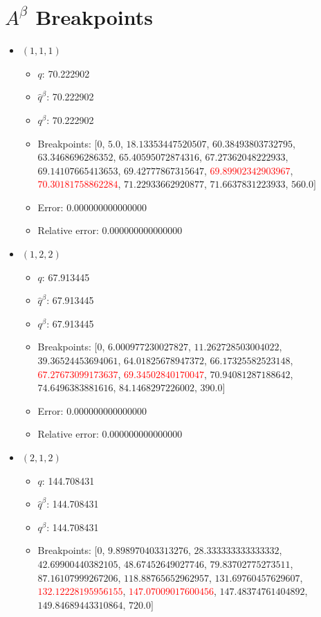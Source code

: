 \documentclass{article}%
\begin{document}
\section{$A^\beta$ Breakpoints}%
\thispagestyle{plain}%
\begin{itemize}%
	\item $(1, 1, 1)$%
	\begin{itemize}%
		\item $q$: 70.222902%
		\item $\hat{q}^\beta$: 70.222902%
		\item $q^\beta$: 70.222902%
		\item Breakpoints: $[$$0$, $5.0$, $18.13353447520507$, $60.38493803732795$, $63.3468696286352$, $65.40595072874316$, $67.27362048222933$, $69.14107665413653$, $69.42777867315647$, \textcolor{red}{$69.89902342903967$}, \textcolor{red}{$70.30181758862284$}, $71.22933662920877$, $71.6637831223933$, $560.0$$]$%
		\item Error: 0.000000000000000%
		\item Relative error: 0.000000000000000%
	\end{itemize}%
	\item $(1, 2, 2)$%
	\begin{itemize}%
		\item $q$: 67.913445%
		\item $\hat{q}^\beta$: 67.913445%
		\item $q^\beta$: 67.913445%
		\item Breakpoints: $[$$0$, $6.000977230027827$, $11.262728503004022$, $39.36524453694061$, $64.01825678947372$, $66.17325582523148$, \textcolor{red}{$67.27673099173637$}, \textcolor{red}{$69.34502840170047$}, $70.94081287188642$, $74.6496383881616$, $84.1468297226002$, $390.0$$]$%
		\item Error: 0.000000000000000%
		\item Relative error: 0.000000000000000%
	\end{itemize}%
	\item $(2, 1, 2)$%
	\begin{itemize}%
		\item $q$: 144.708431%
		\item $\hat{q}^\beta$: 144.708431%
		\item $q^\beta$: 144.708431%
		\item Breakpoints: $[$$0$, $9.898970403313276$, $28.333333333333332$, $42.69900440382105$, $48.67452649027746$, $79.83702775273511$, $87.16107999267206$, $118.88765652962957$, $131.69760457629607$, \textcolor{red}{$132.12228195956155$}, \textcolor{red}{$147.07009017600456$}, $147.48374761404892$, $149.84689443310864$, $720.0$$]$%

\end{itemize}
\end{itemize}
\end{document}
